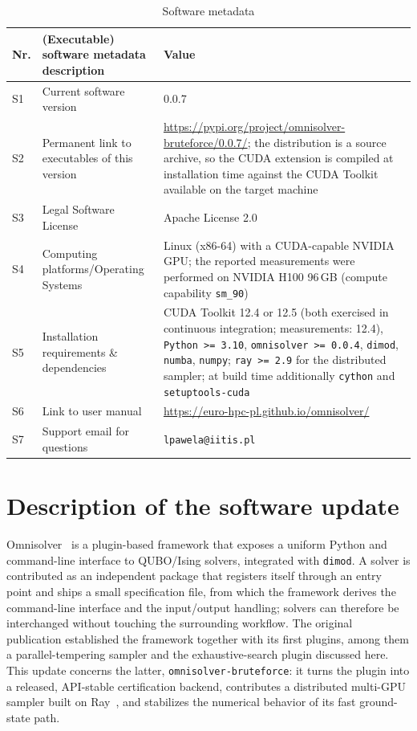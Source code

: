 \documentclass[12pt,a4paper]{elsarticle}
\newcommand{\cudameas}{12.4}
\begin{document}
\begin{table}[H]
\setlength{\tabcolsep}{4pt}
\begin{tabular}{|l|p{5.6cm}|p{6.4cm}|}
\hline
\textbf{Nr.} & \textbf{(Executable) software metadata description} &
\textbf{Value} \\
\hline
S1 & Current software version & 0.0.7 \\
\hline
S2 & Permanent link to executables of this version &
\url{https://pypi.org/project/omnisolver-bruteforce/0.0.7/}; the distribution is
a source archive, so the CUDA extension is compiled at installation time against
the CUDA Toolkit available on the target machine \\
\hline
S3 & Legal Software License & Apache License 2.0 \\
\hline
S4 & Computing platforms/Operating Systems & Linux (x86-64) with a CUDA-capable
NVIDIA GPU; the reported measurements were performed on NVIDIA H100 96\,GB
(compute capability \texttt{sm\_90}) \\
\hline
S5 & Installation requirements \& dependencies & CUDA Toolkit 12.4 or 12.5
(both exercised in continuous integration; measurements: \cudameas), \texttt{Python >= 3.10},
\texttt{omnisolver >= 0.0.4}, \texttt{dimod}, \texttt{numba}, \texttt{numpy};
\texttt{ray >= 2.9} for the distributed sampler; at build time additionally
\texttt{cython} and \texttt{setuptools-cuda} \\
\hline
S6 & Link to user manual & \url{https://euro-hpc-pl.github.io/omnisolver/} \\
\hline
S7 & Support email for questions & \verb|lpawela@iitis.pl| \\
\hline
\end{tabular}
\caption{Software metadata}
\label{softwareMetadata}
\end{table}


\section{Description of the software update}
\label{sec:description}

Omnisolver~\cite{jalowiecki2021omnisolver} is a plugin-based framework that
exposes a uniform Python and command-line interface to QUBO/Ising solvers,
integrated with \texttt{dimod}. A solver is contributed as an independent
package that registers itself through an entry point and ships a small
specification file, from which the framework derives the command-line interface
and the input/output handling; solvers can therefore be interchanged without
touching the surrounding workflow. The original publication established the
framework together with its first plugins, among them a parallel-tempering
sampler and the exhaustive-search plugin discussed here. This update concerns
the latter, \texttt{omnisolver-bruteforce}: it turns the plugin into a released,
API-stable certification backend, contributes a distributed multi-GPU sampler
built on Ray~\cite{DBLP:journals/corr/abs-1712-05889}, and stabilizes the
numerical behavior of its fast ground-state path.
\end{document}
